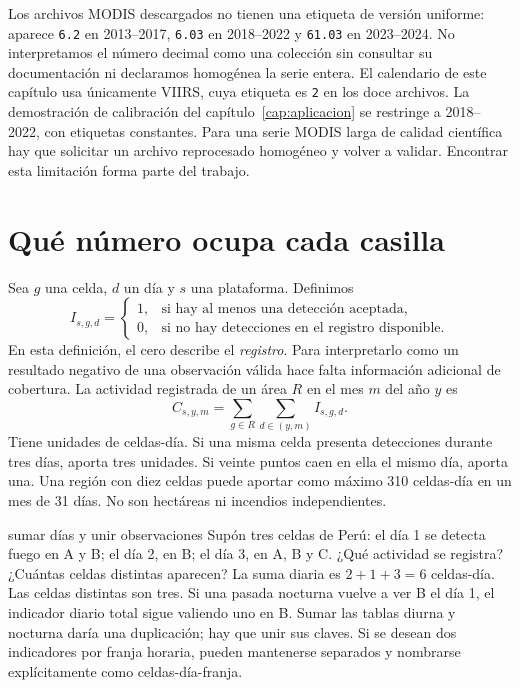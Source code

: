 \begin{atencion}
Los archivos MODIS descargados no tienen una etiqueta de versión uniforme: aparece
\texttt{6.2} en 2013--2017, \texttt{6.03} en 2018--2022 y \texttt{61.03} en 2023--2024.
No interpretamos el número decimal como una colección sin consultar su documentación ni
declaramos homogénea la serie entera. El calendario de este capítulo usa únicamente VIIRS,
cuya etiqueta es \texttt{2} en los doce archivos. La demostración de calibración del
capítulo~\ref{cap:aplicacion} se restringe a 2018--2022, con etiquetas constantes.
Para una serie MODIS larga de calidad científica hay que solicitar un archivo reprocesado
homogéneo y volver a validar. Encontrar esta limitación forma parte del trabajo.
\end{atencion}

\FloatBarrier
\section{Qué número ocupa cada casilla}

Sea $g$ una celda, $d$ un día y $s$ una plataforma. Definimos
\begin{equation}\label{eq:presencia}
 I_{s,g,d}=\begin{cases}
 1,&\text{si hay al menos una detección aceptada},\\
 0,&\text{si no hay detecciones en el registro disponible}.
 \end{cases}
\end{equation}
En esta definición, el cero describe el \emph{registro}. Para interpretarlo como un resultado
negativo de una observación válida hace falta información adicional de cobertura. La
actividad registrada de un área $R$ en el mes $m$ del año $y$ es
\begin{equation}\label{eq:actividad}
 C_{s,y,m}=\sum_{g\in R}\sum_{d\in(y,m)} I_{s,g,d}.
\end{equation}
Tiene unidades de celdas-día. Si una misma celda presenta detecciones durante tres días,
aporta tres unidades. Si veinte puntos caen en ella el mismo día, aporta una. Una región con
diez celdas puede aportar como máximo 310 celdas-día en un mes de 31 días. No son hectáreas ni
incendios independientes.

\begin{ejemplo}{sumar días y unir observaciones}
Supón tres celdas de Perú: el día 1 se detecta fuego en A y B; el día 2, en B; el día 3,
en A, B y C. ¿Qué actividad se registra? ¿Cuántas celdas distintas aparecen?
\solucion La suma diaria es $2+1+3=6$ celdas-día. Las celdas distintas son tres.
Si una pasada nocturna vuelve a ver B el día 1, el indicador diario total sigue valiendo
uno en B. Sumar las tablas diurna y nocturna daría una duplicación; hay que unir sus claves.
Si se desean dos indicadores por franja horaria, pueden mantenerse separados y nombrarse
explícitamente como celdas-día-franja.
\end{ejemplo}

